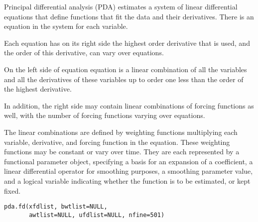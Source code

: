 \documentclass{article}
\begin{document}
\begin{Description}\relax
Principal differential analysis (PDA) estimates a
system of  linear differential equations that define functions
that fit the data and their derivatives.  There is an equation in the
system for each variable.  

Each equation has on its right side the highest order derivative that is used, 
and the order of this derivative,  can vary over equations.    

On the left side of equation equation is a linear combination of all the 
variables and all the derivatives of these variables up to order one less than 
the order  of the highest derivative.

In addition, the right side may contain linear combinations of forcing
functions as well, with the number of forcing functions varying over 
equations.

The linear combinations are defined by weighting functions multiplying each
variable, derivative, and forcing function in the equation.  These weighting
functions may be constant or vary over time.  They are each represented by a
functional parameter object, specifying a basis for an expansion of a
coefficient, a linear differential operator for smoothing purposes, a 
smoothing parameter value, and a logical variable indicating whether the
function is to be estimated, or kept fixed.
\end{Description}
\begin{Usage}
\begin{verbatim}
pda.fd(xfdlist, bwtlist=NULL,
       awtlist=NULL, ufdlist=NULL, nfine=501)
\end{verbatim}
\end{Usage}
\end{document}
